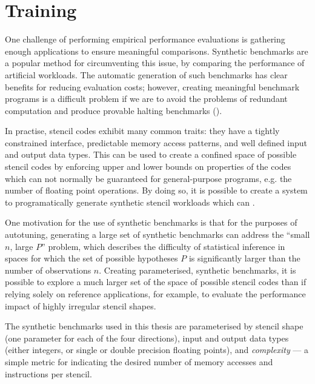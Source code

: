 \section{Training}

One challenge of performing empirical performance evaluations is
gathering enough applications to ensure meaningful
comparisons. Synthetic benchmarks are a popular method for
circumventing this issue, by comparing the performance of artificial
workloads. The automatic generation of such benchmarks has clear
benefits for reducing evaluation costs; however, creating meaningful
benchmark programs is a difficult problem if we are to avoid the
problems of redundant computation and produce provable halting
benchmarks ().

In practise, stencil codes exhibit many common traits: they have a
tightly constrained interface, predictable memory access patterns, and
well defined input and output data types. This can be used to create a
confined space of possible stencil codes by enforcing upper and lower
bounds on properties of the codes which can not normally be guaranteed
for general-purpose programs, e.g. the number of floating point
operations. By doing so, it is possible to create a system to
programatically generate synthetic stencil workloads which can
\TODO{\ldots}.

One motivation for the use of synthetic benchmarks is that for the
purposes of autotuning, generating a large set of synthetic benchmarks
can address the ``small $n$, large $P$'' problem, which describes the
difficulty of statistical inference in spaces for which the set of
possible hypotheses $P$ is significantly larger than the number of
observations $n$\CitationNeeded{}. Creating parameterised, synthetic
benchmarks, it is possible to explore a much larger set of the space
of possible stencil codes than if relying solely on reference
applications, for example, to evaluate the performance impact of
highly irregular stencil shapes.


The synthetic benchmarks used in this thesis are parameterised by
stencil shape (one parameter for each of the four directions), input
and output data types (either integers, or single or double precision
floating points), and \emph{complexity} --- a simple metric for
indicating the desired number of memory accesses and instructions per
stencil.


